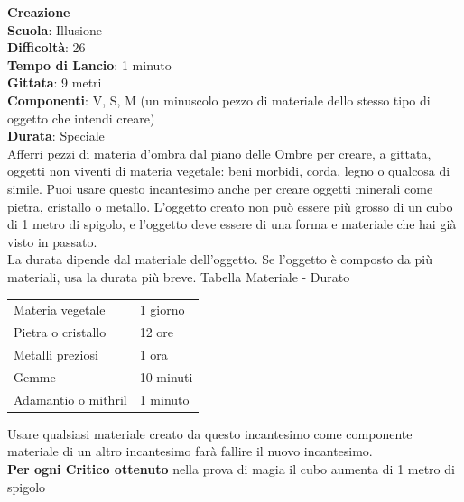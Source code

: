 \begin{multicols}{2}
\medskip\textbf{Creazione}\\
\textbf{Scuola}: Illusione\\
\textbf{Difficoltà}: 26\\
\textbf{Tempo di Lancio}: 1 minuto\\
\textbf{Gittata}: 9 metri\\
\textbf{Componenti}: V, S, M (un minuscolo pezzo di materiale dello stesso tipo di oggetto che intendi creare) \\
\textbf{Durata}: Speciale\\
Afferri pezzi di materia d'ombra dal piano delle Ombre per creare, a gittata, oggetti non viventi di materia vegetale: beni morbidi, corda, legno o qualcosa di simile. Puoi usare questo incantesimo anche per creare oggetti minerali come pietra, cristallo o metallo. L'oggetto creato non può essere più grosso di un cubo di 1 metro di spigolo, e l'oggetto deve essere di una forma e materiale che hai già visto in passato.\\
La durata dipende dal materiale dell'oggetto. Se l'oggetto è composto da più materiali, usa la durata più breve.
\medskip
Tabella Materiale - Durato
\medskip

\begin{tabularx}{0.45\textwidth}{lX}
	\hline 
Materia vegetale &1 giorno\\
Pietra o cristallo &12 ore\\
Metalli preziosi &1 ora\\
Gemme &10 minuti\\
Adamantio o mithril &1 minuto\\
\end{tabularx} 
\medskip

Usare qualsiasi materiale creato da questo incantesimo come componente materiale di un altro incantesimo farà fallire il nuovo incantesimo.\\
\textbf{Per ogni Critico ottenuto} nella prova di magia il cubo aumenta di 1 metro di spigolo


\end{multicols}
